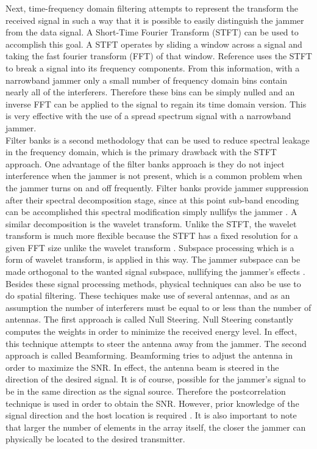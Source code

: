 Next, time-frequency domain filtering attempts to represent the transform the received signal in such a way that it is possible to easily distinguish the jammer from the data signal.  A Short-Time Fourier Transform (STFT) can be used to accomplish this goal.  A STFT operates by sliding a window across a signal and taking the fast fourier transform (FFT) of that window. Reference \cite{12} uses the STFT to break a signal into its frequency components. From this information, with a narrowband jammer only a small number of frequency domain bins contain nearly all of the interferers.  Therefore these bins can be simply nulled and an inverse FFT can be applied to the signal to regain its time domain version.  This is very effective with the use of a spread spectrum signal with a narrowband jammer.\\

%
%

Filter banks is a second methodology that can be used to reduce spectral leakage in the frequency domain, which is the primary drawback with the STFT approach.  One advantage of the filter banks approach is they do not inject interference when the jammer is not present, which is a common problem when the jammer turns on and off frequently.  Filter banks provide jammer suppression after their spectral decomposition stage, since at this point sub-band encoding can be accomplished this spectral modification simply nullifys the jammer \cite{13}.  A similar decomposition is the wavelet transform.  Unlike the STFT, the wavelet transform is much more flexible because the STFT has a fixed resolution for a given FFT size unlike the wavelet transform \cite{wavelet}.  Subspace processing which is a form of wavelet transform, is applied in this way.  The jammer subspace can be made orthogonal to the wanted signal subspace, nullifying the jammer's effects \cite{14}.\\

Besides these signal processing methods, physical techniques can also be use to do spatial filtering.  These techiques make use of several antennas, and as an assumption the number of interferers must be equal to or less than the number of antennas.  The first approach is called Null Steering.  Null Steering constantly computes the weights in order to minimize the received energy level. In effect, this technique attempts to steer the antenna away from the jammer.  The second approach is called Beamforming.  Beamforming tries to adjust the antenna in order to maximize the SNR. In effect, the antenna beam is steered in the direction of the desired signal.  It is of course, possible for the jammer's signal to be in the same direction as the signal source. Therefore the postcorrelation technique is used in order to obtain the SNR. However, prior knowledge of the signal direction and the host location is required \cite{kandangath}.  It is also important to note that larger the number of elements in the array itself, the closer the jammer can physically be located to the desired transmitter.\\


